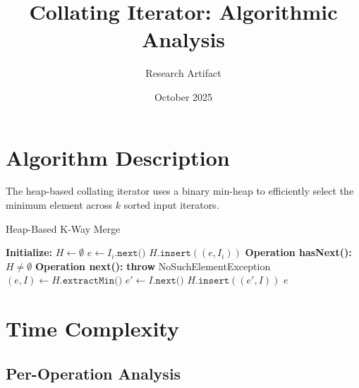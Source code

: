 \documentclass[11pt]{article}
\title{Collating Iterator: Algorithmic Analysis}
\author{Research Artifact}
\date{October 2025}
\begin{document}
\maketitle

\section{Algorithm Description}

The heap-based collating iterator uses a binary min-heap to efficiently select the minimum element across $k$ sorted input iterators.

\begin{algorithm}
\caption{Heap-Based K-Way Merge}
\begin{algorithmic}[1]
\State \textbf{Initialize:}
\State $H \gets \emptyset$ 
        \State $e \gets I_i.\texttt{next()}$
        \State $H.\texttt{insert}((e, I_i))$
    \EndIf
\EndFor
\State
\State \textbf{Operation hasNext():}
\State \Return $H \neq \emptyset$
\State
\State \textbf{Operation next():}
    \State \textbf{throw} NoSuchElementException
\EndIf
\State $(e, I) \gets H.\texttt{extractMin()}$
    \State $e' \gets I.\texttt{next()}$
    \State $H.\texttt{insert}((e', I))$
\EndIf
\State \Return $e$
\end{algorithmic}
\end{algorithm}

\section{Time Complexity}

\subsection{Per-Operation Analysis}
\end{document}
